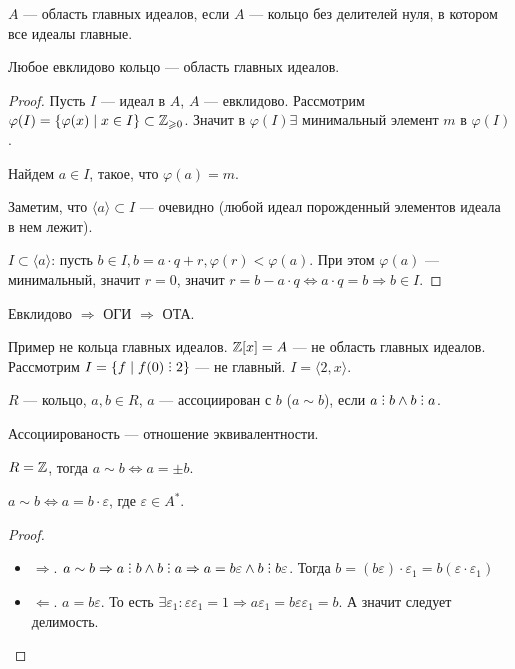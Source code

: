 \begin{definition}
    $A$ --- область главных идеалов, если  $A$ --- кольцо без делителей нуля, в котором все идеалы главные.
\end{definition}
\begin{theorem}
    Любое евклидово кольцо --- область главных идеалов.
\end{theorem}
\begin{proof}
    Пусть $I$ --- идеал в  $A$,  $A$ --- евклидово. Рассмотрим  $\varphi(I) = \{\varphi(x) \mid x\in I\} \subset \mathbb{Z}_{\geqslant 0}$. Значит в $\varphi(I) \exists$ минимальный элемент $m$ в  $\varphi(I)$.  

    Найдем $a \in I$, такое, что  $\varphi(a) = m$. 

    Заметим, что  $\langle a \rangle \subset I$ --- очевидно (любой идеал порожденный элементов идеала в нем лежит).

    $I \subset \langle a \rangle$: пусть $b \in I, b = a \cdot q + r, \varphi(r) < \varphi(a)$. При этом $\varphi(a)$ --- минимальный, значит  $r = 0$, значит  $r = b - a \cdot q \iff a \cdot q = b \Rightarrow b \in I$.
\end{proof}
\slashn
Евклидово $\Rightarrow$ ОГИ  $\Rightarrow$ ОТА.
\begin{remark}
    Пример не кольца главных идеалов. $\mathbb{Z}[x] = A$ --- не область главных идеалов. Рассмотрим  $I = \{f \mid f(0) \divby 2\}$ --- не главный.  $I = \langle 2, x \rangle$.    
\end{remark}
\begin{definition}
    $R$ --- кольцо,  $a, b \in R$,  $a$ --- ассоциирован с  $b$ ($a \sim b$), если $a \divby b \land b \divby a$.
\end{definition}
\begin{remark}
    Ассоциированость --- отношение эквивалентности.
\end{remark}
\begin{example}
    $R= \mathbb{Z}$, тогда  $a \sim b \iff a = \pm b$.
\end{example}
\begin{lemma}
    $a \sim b \iff a = b \cdot \varepsilon$, где  $\varepsilon \in A^*$.
\end{lemma}
\begin{proof}
    \slashn
    \begin{itemize}
        \item  $\Rightarrow$.  $a \sim b \Rightarrow a \divby b \land b \divby a \Rightarrow a = b \varepsilon \land b \divby b \varepsilon$. Тогда $b = (b \varepsilon) \cdot \varepsilon_1 = b (\varepsilon \cdot \varepsilon_1)$
        \item $\Leftarrow$.  $a = b \varepsilon$. То есть  $\exists \varepsilon_1: \varepsilon \varepsilon_1 = 1 \Rightarrow a \varepsilon_1 = b \varepsilon \varepsilon_1 = b$. А значит следует делимость.
    \end{itemize}
\end{proof}
